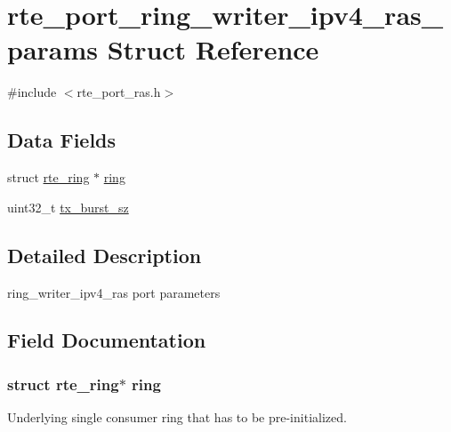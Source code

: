 \hypertarget{structrte__port__ring__writer__ipv4__ras__params}{}\section{rte\+\_\+port\+\_\+ring\+\_\+writer\+\_\+ipv4\+\_\+ras\+\_\+params Struct Reference}
\label{structrte__port__ring__writer__ipv4__ras__params}


{\ttfamily \#include $<$rte\+\_\+port\+\_\+ras.\+h$>$}

\subsection*{Data Fields}
\begin{DoxyCompactItemize}
\item 
struct \hyperlink{structrte__ring}{rte\+\_\+ring} $\ast$ \hyperlink{structrte__port__ring__writer__ipv4__ras__params_a1dfc25cca5a340eff30700b60fd41339}{ring}
\item 
uint32\+\_\+t \hyperlink{structrte__port__ring__writer__ipv4__ras__params_a9ed7dbe6241b97c9b68a9491e77c84d0}{tx\+\_\+burst\+\_\+sz}
\end{DoxyCompactItemize}


\subsection{Detailed Description}
ring\+\_\+writer\+\_\+ipv4\+\_\+ras port parameters 

\subsection{Field Documentation}
\hypertarget{structrte__port__ring__writer__ipv4__ras__params_a1dfc25cca5a340eff30700b60fd41339}{}
\subsubsection[{ring}]{\setlength{\rightskip}{0pt plus 5cm}struct {\bf rte\+\_\+ring}$\ast$ ring}\label{structrte__port__ring__writer__ipv4__ras__params_a1dfc25cca5a340eff30700b60fd41339}
Underlying single consumer ring that has to be pre-\/initialized. \hypertarget{structrte__port__ring__writer__ipv4__ras__params_a9ed7dbe6241b97c9b68a9491e77c84d0}{}
